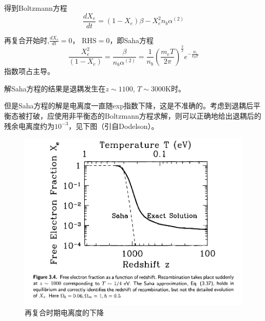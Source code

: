 \documentclass[12pt]{ctexart}
\begin{document}
得到Boltzmann方程
\begin{equation}
    \frac{d X_{e}}{d t}=\left(1-X_{e}\right) \beta-X_{e}^{2} n_{b} \alpha^{(2)}
\end{equation}

再复合开始时,$\frac{d X_{e}}{d t}=0$， $\text{RHS}=0$，即Saha方程
\begin{equation}
    \frac{X_{e}^{2}}{\left(1-X_{e}\right)} = \frac{\beta}{n_{b} \alpha^{(2)}} = \frac{1 }{n_b} \left(\frac{m_{e} T}{2 \pi}\right)^\frac{3 }{2} e^{-\frac{B_1}{k_B T}}
\end{equation}
指数项占主导。

解Saha方程的结果是退耦发生在$z\sim 1100$, $T\sim 3000\mathrm{K}$时。

但是Saha方程的解是电离度一直随exp指数下降，这是不准确的。考虑到退耦后平衡态被打破，应使用非平衡态的Boltzmann方程求解，则可以正确地给出退耦后的残余电离度约为$10^{-3}$，见下图（引自Dodelson）。
\begin{figure}[!hbtp]
	\centering
	\includegraphics[width=1.0\linewidth]{recombination.jpg}
	\caption{再复合时期电离度的下降} 
\end{figure}
\end{document}
